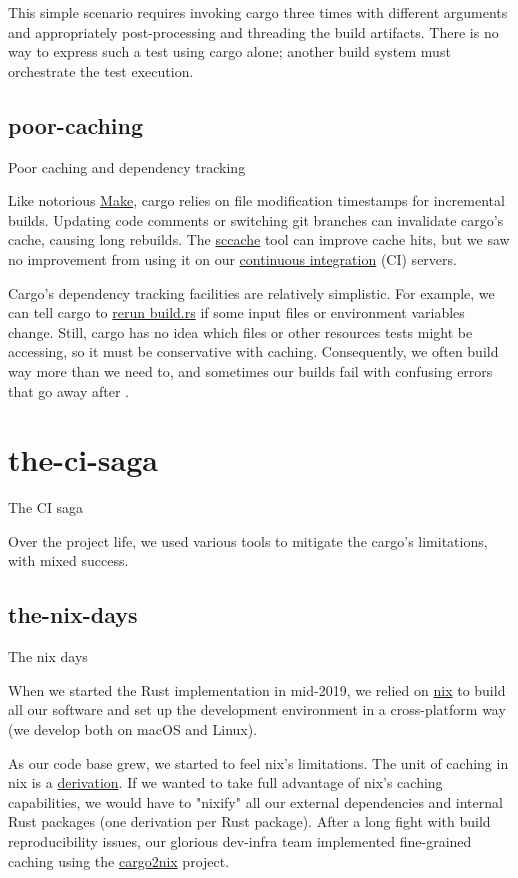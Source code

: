 \documentclass{article}
\begin{document}
This simple scenario requires invoking cargo three times with different arguments and appropriately post-processing and threading the build artifacts.
There is no way to express such a test using cargo alone; another build system must orchestrate the test execution.

\subsection{poor-caching}{Poor caching and dependency tracking}

Like notorious \href{https://en.wikipedia.org/wiki/Make_(software)}{Make}, cargo relies on file modification timestamps for incremental builds.
Updating code comments or switching git branches can invalidate cargo's cache, causing long rebuilds.
The \href{https://github.com/mozilla/sccache}{sccache} tool can improve cache hits, but we saw no improvement from using it on our \href{https://en.wikipedia.org/wiki/Continuous_integration}{continuous integration} (CI) servers.

Cargo's dependency tracking facilities are relatively simplistic.
For example, we can tell cargo to \href{https://doc.rust-lang.org/cargo/reference/build-scripts.html#outputs-of-the-build-script}{rerun build.rs} if some input files or environment variables change.
Still, cargo has no idea which files or other resources tests might be accessing, so it must be conservative with caching.
Consequently, we often build way more than we need to, and sometimes our builds fail with confusing errors that go away after .

\section{the-ci-saga}{The CI saga}

Over the project life, we used various tools to mitigate the cargo's limitations, with mixed success. 

\subsection{the-nix-days}{The nix days}

When we started the Rust implementation in mid-2019, we relied on \href{https://nixos.org/}{nix} to build all our software and set up the development environment in a cross-platform way (we develop both on macOS and Linux).

As our code base grew, we started to feel nix's limitations.
The unit of caching in nix is a \href{https://nixos.org/manual/nix/stable/language/derivations.html}{derivation}.
If we wanted to take full advantage of nix's caching capabilities, we would have to "nixify" all our external dependencies and internal Rust packages (one derivation per Rust package).
After a long fight with build reproducibility issues, our glorious dev-infra team implemented fine-grained caching using the \href{https://github.com/cargo2nix/cargo2nix}{cargo2nix} project.
\end{document}
